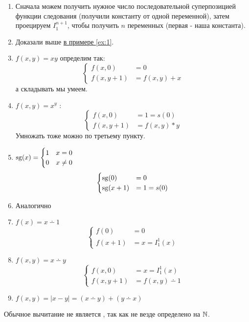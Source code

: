 \begin{proof*}
	\begin{enumerate}
		\item Сначала можем получить нужное число последовательной суперпозицией функции следования (получили константу от одной переменной), затем проецируем $ I^{n + 1}_{1}$, чтобы получить $ n$ переменных (первая - наша константа).
		\item Доказали выше \hyperref[ex:1]{в примере \ref{ex:1}}.
		\item $ f(x, y) = xy$ определим так:
			\[
			\begin{cases}
				f(x, 0) &= 0\\
				f(x, y+1) &= f(x, y) + x
			\end{cases}
			\] 
			а складывать мы умеем.
		\item $ f(x, y) = x^{y}$ :
			\[
			\begin{cases}
				f(x, 0) &= 1 = s(0) \\
				f(x, y+1) &= f(x, y) * y
			\end{cases}
			\] 
			Умножать тоже можно по третьему пункту.
		\item  $ \operatorname{sg}(x) = \begin{cases}
				1&x=0 \\
				0& x\ne 0
		\end{cases}$
		\[
		\begin{cases}
			\operatorname{sg}(0) &= 0 \\
			\operatorname{sg}(x+1) &= 1 = s(0)
		\end{cases}
		\] 
	\item Аналогично
	\item $ f(x) = x \dotminus 1$ 
		\[
		\begin{cases}
			f(0) &=0 \\
			f(x+1) &= x = I^{1}_{1} (x)
		\end{cases}
		\] 
	\item $ f(x, y) = x \dotminus y$
		\[
		\begin{cases}
			f(x, 0) &= x = I^{1}_{1}(x)  \\
			f(x, y+1) &= f(x, y) \dotminus 1
		\end{cases}
		\] 
	\item $ f(x, y) = \lvert x - y \rvert  = (x \dotminus y) + (y \dotminus x)$
    \end{enumerate}
\end{proof*}
\begin{note}
    Обычное вычитание не является \prf, так как не везде определено на $ \mathbb{N}$.
\end{note}



